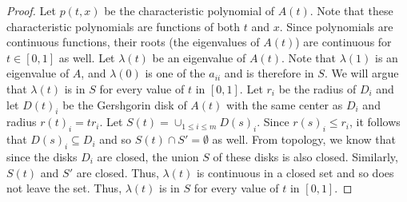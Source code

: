\begin{proof}
Let $p(t,x)$ be the characteristic polynomial of $A(t)$. Note that these characteristic polynomials are functions of both $t$ and $x$. Since polynomials are continuous functions, their roots (the eigenvalues of $A(t)$) are continuous for $t \in [0,1]$ as well. Let $\lambda(t)$ be an eigenvalue of $A(t)$. Note that $\lambda(1)$ is an eigenvalue of $A$, and $\lambda(0)$ is one of the $a_{ii}$ and is therefore in $S$. We will argue that $\lambda(t)$ is in $S$ for every value of $t$ in $[0,1]$. Let $r_i$ be the radius of $D_i$ and let $D(t)_i$ be the Gershgorin disk of $A(t)$ with the same center as $D_i$ and radius  $r(t)_i = tr_i$. Let $S(t) = \cup_{1 \leq i \leq m} D(s)_i$. Since $r(s)_i \leq r_i$, it follows that $D(s)_i \subseteq D_i$ and so $S(t) \cap S' = \emptyset$ as well. From topology, we know that since the disks $D_i$ are closed, the union $S$ of these disks is also closed. Similarly, $S(t)$ and $S'$ are closed. Thus, $\lambda(t)$ is continuous in a closed set and so does not leave the set. Thus, $\lambda(t)$ is in $S$ for every value of $t$ in $[0,1]$. 

\end{proof}

